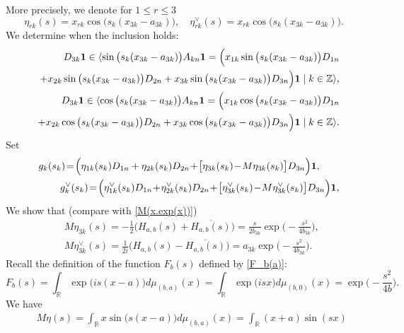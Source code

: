 \documentclass[preprint,12pt]{elsarticle}
\newcommand{\commA}[1]{\marginpar{%
\begin{color}{red}
\vskip-\baselineskip %
\raggedright\footnotesize
\itshape\hrule \smallskip A: #1\par\smallskip\hrule\end{color}}}
\numberwithin{equation}{section}
\begin{document}
\begin{pf}
More precisely, we denote for $1\leq r\leq 3$
\begin{equation}
\label{eta-re.3}
\eta_{rk}(s)=x_{rk}\cos\big(s_k(x_{3k}-a_{3k})\big)
,\quad
\eta^{\vee}_{rk}(s)=x_{rk}\cos\big(s_k(x_{3k}-a_{3k})\big).
\end{equation}
We determine when the inclusion holds:
\begin{eqnarray*}
 &&
D_{3k}{\bf 1}\in \langle 
\sin\big(s_k(x_{3k}-a_{3k})\big)A_{kn}{\bf 1}
=\Big(x_{1k}
\sin\big(s_k(x_{3k}-a_{3k})\big)D_{1n}\\
&& +x_{2k}\sin\big(s_k(x_{3k}-a_{3k})\big)D_{2n}+x_{3k}\sin\big(s_k(x_{3k}-a_{3k})\big)D_{3n}\Big){\bf 1}\mid k\in {\mathbb Z}\rangle,\\
 &&
D_{3k}{\bf 1}\in \langle 
\cos\big(s_k(x_{3k}-a_{3k})\big)A_{kn}{\bf 1}
=\Big(x_{1k}
\cos\big(s_k(x_{3k}-a_{3k})\big)D_{1n}\\
&& +x_{2k}\cos\big(s_k(x_{3k}-a_{3k})\big)D_{2n}+x_{3k}\cos\big(s_k(x_{3k}-a_{3k})\big)D_{3n}\Big){\bf 1}\mid k\in {\mathbb Z}\rangle.
\end{eqnarray*} 
 Set 
%
\begin{eqnarray}
\label{g_k(s)}
&&
g_k(s_k)\!=\!\Big(\eta_{1k}(s_k)D_{1n}+\eta_{2k}(s_k)D_{2n}\!+\!\big[\eta_{3k}(s_k)\!-\!M\eta_{3k}(s_k)\big]D_{3n}\Big){\bf 1},\qquad \\
\label{g^v_k(s)}
&&
g^{\vee}_k(s_k)\!=\!\Big(\eta^{\vee}_{1k}(s_k)D_{1n}\!+\!\eta^{\vee}_{2k}(s_k)D_{2n}\!+\!\big[\eta^{\vee}_{3k}(s_k)\!-\!M\eta^{\vee}_{3k}(s_k)\big]D_{3n}\Big){\bf 1},
\end{eqnarray}
We show that (compare with \eqref{M(x.exp(x))}) %
%
\begin{eqnarray}
 \label{M-eta.3}
&&M\eta_{3k}(s)=
-\frac{1}{2}\Big(H_{a,b}(s)+\overline{H_{a,b}(s)}\Big)=
\frac{s}{2b_{3k}}\exp\Big(-\frac{s^2}{4b_{3k}}\Big),\\
 \label{M-eta^.3}
&&M\eta^{\vee}_{3k}(s)=
\frac{1}{2i}\Big(H_{a,b}(s)-\overline{H_{a,b}(s)}\Big)=
a_{3k}
\exp\Big(-\frac{s^2}{4b_{3k}}\Big).
\end{eqnarray}
Recall the definition of the  function $F_b(s)$
defined by \eqref{F_b(a)}:
\begin{equation}
\label{F_b(a).1}
F_b(s) =\int_{\mathbb R}\exp\big(is(x-a)\big)d\mu_{(b,a)}(x)=
\int_{\mathbb R}\exp\big(isx\big)d\mu_{(b,0)}(x)=\exp\Big(-\frac{s^2}{4b}\Big).
\end{equation}
We have 
\begin{eqnarray*}
&&
M\eta(s)=
\int_{\mathbb R}x\sin\big(s(x-a)\big)d\mu_{(b,a)}(x)=
\int_{\mathbb R}(x+a)\sin(sx)

\end{eqnarray*}
\end{pf}
\end{document}
